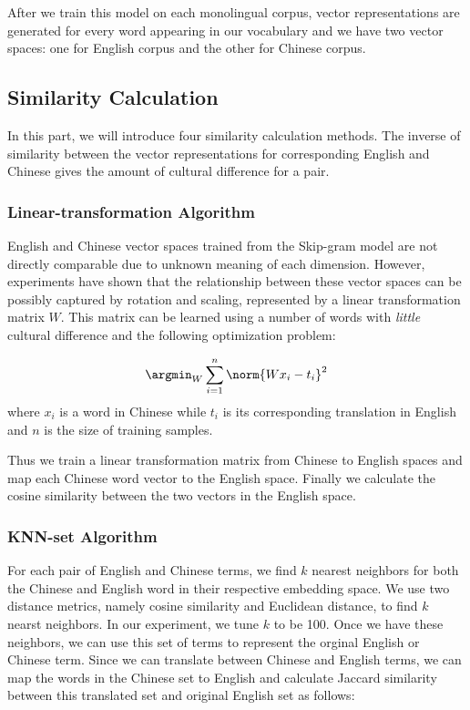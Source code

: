 After we train this model on each monolingual corpus, vector representations are generated for every word appearing in our vocabulary and we have two vector spaces: one for English corpus and the other for Chinese corpus.

\subsection{Similarity Calculation}

In this part, we will introduce four similarity calculation methods.
The inverse of similarity between the vector representations for
corresponding English and Chinese gives the amount of cultural difference
for a pair.

\subsubsection{Linear-transformation Algorithm}

English and Chinese vector spaces trained from the Skip-gram model
are not directly comparable due to unknown meaning of each dimension.
However, experiments \cite{Mikolov:2013tp} have shown that the relationship
between these vector spaces can be possibly captured by
rotation and scaling, represented by a linear transformation matrix $W$.
This matrix can be learned using a number of words with {\em little}
cultural difference and the following optimization problem:

\begin{equation*}
\argmin_{W}\sum_{i=1}^{n}\norm{Wx_{i}-t_{i}}^2
\end{equation*}
where $x_{i}$ is a word in Chinese while $t_{i}$ is its
corresponding translation in English and $n$ is the size of
training samples.

Thus we train a linear transformation matrix from Chinese to English spaces and map each Chinese word vector to the English space. Finally we calculate the cosine similarity between the two vectors in the English space.

\subsubsection{KNN-set Algorithm}

For each pair of English and Chinese terms, we find $k$ nearest neighbors
for both the Chinese and English word in their respective embedding space.
We use two distance metrics, namely cosine similarity and Euclidean distance,
to find $k$ nearst neighbors. In our experiment, we tune $k$ to be 100. Once we have these neighbors, we can use
this set of terms to represent the orginal English or Chinese term.
Since we can translate between Chinese and English terms,
we can map the words in the Chinese set to English and calculate
Jaccard similarity between this translated set and original English set as follows:

